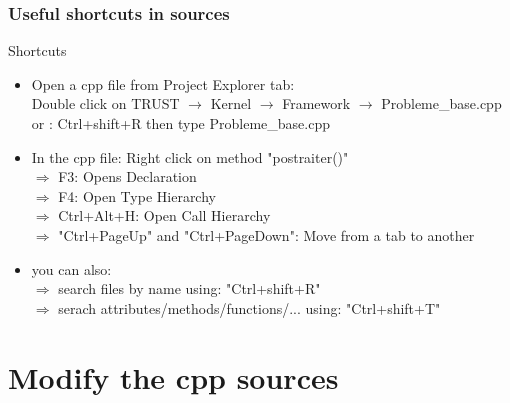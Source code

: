 \documentclass[10pt, hyperref={unicode=true,pdfusetitle, bookmarks=true,bookmarksnumbered=false,bookmarksopen=false, breaklinks=false,pdfborder={0 0 1},backref=true,colorlinks=true,linkcolor=darkblue,pageanchor, urlcolor=darkblue}]{beamer}
\begin{document}
\begin{frame}
\frametitle{Useful shortcuts in sources}

\begin{exampleblock}{Shortcuts}
\vspace{0.2cm}
\begin{itemize} 
\item Open a cpp file from Project Explorer tab: \\
  Double click on TRUST $\rightarrow$ Kernel $\rightarrow$ Framework $\rightarrow$ Probleme\_base.cpp \\ \vspace{0.2cm}
  or : Ctrl+shift+R then type Probleme\_base.cpp \\ \vspace{0.2cm}
\item In the cpp file: Right click on method "postraiter()" \\
  $\Rightarrow$ F3: Opens Declaration \\
  $\Rightarrow$ F4: Open Type Hierarchy \\
  $\Rightarrow$ Ctrl+Alt+H: Open Call Hierarchy \\
  $\Rightarrow$ "Ctrl+PageUp" and "Ctrl+PageDown": Move from a tab to another
\item you can also: \\
  $\Rightarrow$ search files by name using: "Ctrl+shift+R" \\
  $\Rightarrow$ serach attributes/methods/functions/... using: "Ctrl+shift+T"
\end{itemize}
\end{exampleblock}

\end{frame}


\section{{\bf{Modify the cpp sources}}}
\end{document}
